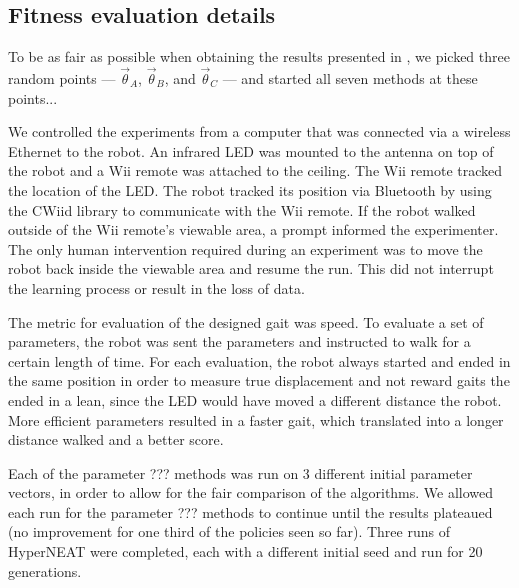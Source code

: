 \subsection{Fitness evaluation details}


To be as fair as possible when obtaining the results presented in
, we picked three random points --- $\vec{\theta}_A$,
$\vec{\theta}_B$, and $\vec{\theta}_C$ --- and started all seven
methods at these points...



We controlled the experiments from a computer that was connected via a
wireless Ethernet to the robot. An infrared LED was mounted to the
antenna on top of the robot and a Wii remote was attached to the
ceiling. The Wii remote tracked the location of the LED. The robot
tracked its position via Bluetooth by using the CWiid
library\cite{cwiid} to communicate with the Wii remote. If the robot
walked outside of the Wii remote's viewable area, a prompt informed
the experimenter. The only human intervention required during an
experiment was to move the robot back inside the viewable area and
resume the run. This did not interrupt the learning process or result
in the loss of data.

The metric for evaluation of the designed gait was speed. To evaluate
a set of parameters, the robot was sent the parameters and instructed
to walk for a certain length of time. For each evaluation, the robot
always started and ended in the same position in order to measure true
displacement and not reward gaits the ended in a lean, since the LED
would have moved a different distance the robot. More efficient
parameters resulted in a faster gait, which translated into a longer
distance walked and a better score.

Each of the parameter ??? methods was run on 3 different initial
parameter vectors, in order to allow for the fair comparison of the
algorithms. We allowed each run for the parameter ??? methods to
continue until the results plateaued (no improvement for one third of
the policies seen so far). Three runs of HyperNEAT were completed,
each with a different initial seed and run for 20 generations.
